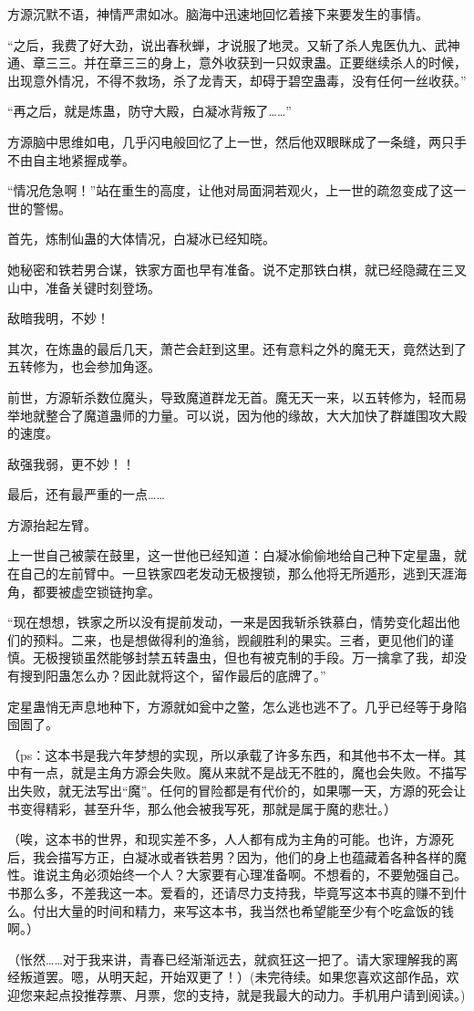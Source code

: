\begin{this_body}
方源沉默不语，神情严肃如冰。脑海中迅速地回忆着接下来要发生的事情。

“之后，我费了好大劲，说出春秋蝉，才说服了地灵。又斩了杀人鬼医仇九、武神通、章三三。并在章三三的身上，意外收获到一只奴隶蛊。正要继续杀人的时候，出现意外情况，不得不救场，杀了龙青天，却碍于碧空蛊毒，没有任何一丝收获。”

“再之后，就是炼蛊，防守大殿，白凝冰背叛了……”

方源脑中思维如电，几乎闪电般回忆了上一世，然后他双眼眯成了一条缝，两只手不由自主地紧握成拳。

“情况危急啊！”站在重生的高度，让他对局面洞若观火，上一世的疏忽变成了这一世的警惕。

首先，炼制仙蛊的大体情况，白凝冰已经知晓。

她秘密和铁若男合谋，铁家方面也早有准备。说不定那铁白棋，就已经隐藏在三叉山中，准备关键时刻登场。

敌暗我明，不妙！

其次，在炼蛊的最后几天，萧芒会赶到这里。还有意料之外的魔无天，竟然达到了五转修为，也会参加角逐。

前世，方源斩杀数位魔头，导致魔道群龙无首。魔无天一来，以五转修为，轻而易举地就整合了魔道蛊师的力量。可以说，因为他的缘故，大大加快了群雄围攻大殿的速度。

敌强我弱，更不妙！！

最后，还有最严重的一点……

方源抬起左臂。

上一世自己被蒙在鼓里，这一世他已经知道：白凝冰偷偷地给自己种下定星蛊，就在自己的左前臂中。一旦铁家四老发动无极搜锁，那么他将无所遁形，逃到天涯海角，都要被虚空锁链拘拿。

“现在想想，铁家之所以没有提前发动，一来是因我斩杀铁慕白，情势变化超出他们的预料。二来，也是想做得利的渔翁，觊觎胜利的果实。三者，更见他们的谨慎。无极搜锁虽然能够封禁五转蛊虫，但也有被克制的手段。万一擒拿了我，却没有搜到阳蛊怎么办？因此就将这个，留作最后的底牌了。”

定星蛊悄无声息地种下，方源就如瓮中之鳖，怎么逃也逃不了。几乎已经等于身陷囹圄了。

（ps：这本书是我六年梦想的实现，所以承载了许多东西，和其他书不太一样。其中有一点，就是主角方源会失败。魔从来就不是战无不胜的，魔也会失败。不描写出失败，就无法写出“魔”。任何的冒险都是有代价的，如果哪一天，方源的死会让书变得精彩，甚至升华，那么他会被我写死，那就是属于魔的悲壮。）

（唉，这本书的世界，和现实差不多，人人都有成为主角的可能。也许，方源死后，我会描写方正，白凝冰或者铁若男？因为，他们的身上也蕴藏着各种各样的魔性。谁说主角必须始终一个人？大家要有心理准备啊。不想看的，不要勉强自己。书那么多，不差我这一本。爱看的，还请尽力支持我，毕竟写这本书真的赚不到什么。付出大量的时间和精力，来写这本书，我当然也希望能至少有个吃盒饭的钱啊。）

（怅然……对于我来讲，青春已经渐渐远去，就疯狂这一把了。请大家理解我的离经叛道罢。嗯，从明天起，开始双更了！）(未完待续。如果您喜欢这部作品，欢迎您来起点投推荐票、月票，您的支持，就是我最大的动力。手机用户请到阅读。)

\end{this_body}

